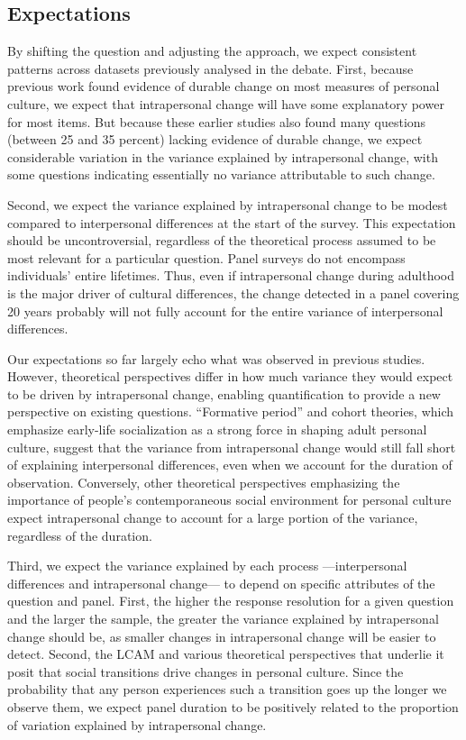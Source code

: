 \documentclass[
  12pt,
]{article}
\begin{document}
\hypertarget{expectations}{%
\subsection{Expectations}\label{expectations}}

By shifting the question and adjusting the approach, we expect
consistent patterns across datasets previously analysed in the debate.
First, because previous work found evidence of durable change on most
measures of personal culture, we expect that intrapersonal change will
have some explanatory power for most items. But because these earlier
studies also found many questions (between 25 and 35 percent) lacking
evidence of durable change, we expect considerable variation in the
variance explained by intrapersonal change, with some questions
indicating essentially no variance attributable to such change.

Second, we expect the variance explained by intrapersonal change to be
modest compared to interpersonal differences at the start of the survey.
This expectation should be uncontroversial, regardless of the
theoretical process assumed to be most relevant for a particular
question. Panel surveys do not encompass individuals' entire lifetimes.
Thus, even if intrapersonal change during adulthood is the major driver
of cultural differences, the change detected in a panel covering 20
years probably will not fully account for the entire variance of
interpersonal differences.

Our expectations so far largely echo what was observed in previous
studies. However, theoretical perspectives differ in how much variance
they would expect to be driven by intrapersonal change, enabling
quantification to provide a new perspective on existing questions.
``Formative period'' and cohort theories, which emphasize early-life
socialization as a strong force in shaping adult personal culture,
suggest that the variance from intrapersonal change would still fall
short of explaining interpersonal differences, even when we account for
the duration of observation. Conversely, other theoretical perspectives
emphasizing the importance of people's contemporaneous social
environment for personal culture expect intrapersonal change to account
for a large portion of the variance, regardless of the duration.

Third, we expect the variance explained by each process ---interpersonal
differences and intrapersonal change--- to depend on specific attributes
of the question and panel. First, the higher the response resolution for
a given question and the larger the sample, the greater the variance
explained by intrapersonal change should be, as smaller changes in
intrapersonal change will be easier to detect. Second, the LCAM and
various theoretical perspectives that underlie it posit that social
transitions drive changes in personal culture. Since the probability
that any person experiences such a transition goes up the longer we
observe them, we expect panel duration to be positively related to the
proportion of variation explained by intrapersonal change.
\end{document}
